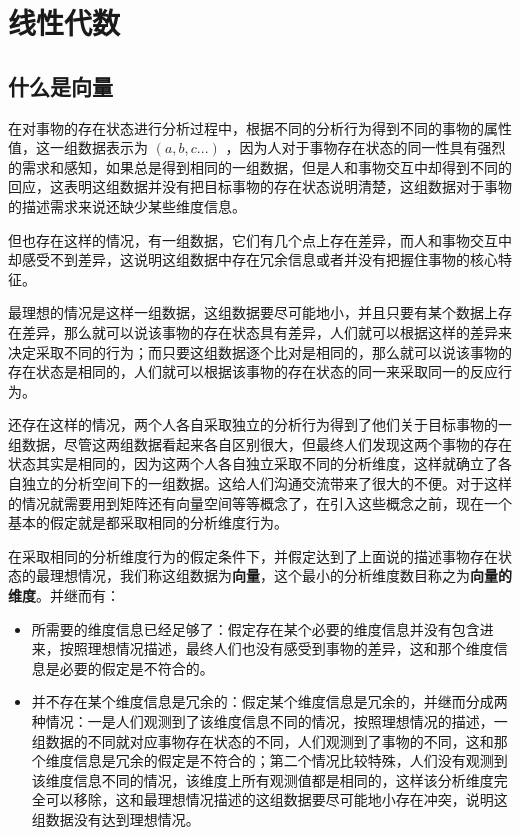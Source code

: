 \documentclass[12pt,oneside]{book}
\begin{document}
\chapter{线性代数}
\section{什么是向量}
在对事物的存在状态进行分析过程中，根据不同的分析行为得到不同的事物的属性值，这一组数据表示为 $(a, b, c...)$ ，因为人对于事物存在状态的同一性具有强烈的需求和感知，如果总是得到相同的一组数据，但是人和事物交互中却得到不同的回应，这表明这组数据并没有把目标事物的存在状态说明清楚，这组数据对于事物的描述需求来说还缺少某些维度信息。

但也存在这样的情况，有一组数据，它们有几个点上存在差异，而人和事物交互中却感受不到差异，这说明这组数据中存在冗余信息或者并没有把握住事物的核心特征。

最理想的情况是这样一组数据，这组数据要尽可能地小，并且只要有某个数据上存在差异，那么就可以说该事物的存在状态具有差异，人们就可以根据这样的差异来决定采取不同的行为；而只要这组数据逐个比对是相同的，那么就可以说该事物的存在状态是相同的，人们就可以根据该事物的存在状态的同一来采取同一的反应行为。

还存在这样的情况，两个人各自采取独立的分析行为得到了他们关于目标事物的一组数据，尽管这两组数据看起来各自区别很大，但最终人们发现这两个事物的存在状态其实是相同的，因为这两个人各自独立采取不同的分析维度，这样就确立了各自独立的分析空间下的一组数据。这给人们沟通交流带来了很大的不便。对于这样的情况就需要用到矩阵还有向量空间等等概念了，在引入这些概念之前，现在一个基本的假定就是都采取相同的分析维度行为。

在采取相同的分析维度行为的假定条件下，并假定达到了上面说的描述事物存在状态的最理想情况，我们称这组数据为\textbf{向量}，这个最小的分析维度数目称之为\textbf{向量的维度}。并继而有：

\begin{itemize}
\item 所需要的维度信息已经足够了：假定存在某个必要的维度信息并没有包含进来，按照理想情况描述，最终人们也没有感受到事物的差异，这和那个维度信息是必要的假定是不符合的。
\item 并不存在某个维度信息是冗余的：假定某个维度信息是冗余的，并继而分成两种情况：一是人们观测到了该维度信息不同的情况，按照理想情况的描述，一组数据的不同就对应事物存在状态的不同，人们观测到了事物的不同，这和那个维度信息是冗余的假定是不符合的；第二个情况比较特殊，人们没有观测到该维度信息不同的情况，该维度上所有观测值都是相同的，这样该分析维度完全可以移除，这和最理想情况描述的这组数据要尽可能地小存在冲突，说明这组数据没有达到理想情况。
\end{itemize}
\end{document}
